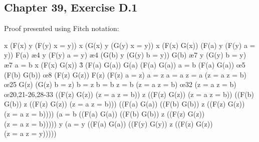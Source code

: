 \documentclass[10pt]{article}
\begin{document}
\subsection*{Chapter 39, Exercise D.1}

Proof presented using Fitch notation:

\begin{fitchproof}[arrayenv=longtable]
   {\exists x (F(x) \land \forall y (F(y) \to x = y))} 
   {\exists x (G(x) \land \forall y (G(y) \to x = y))} 
   {\forall x \neg (F(x) \land G(x))} 
  \open
   {(F(a) \land \forall y (F(y) \to a = y))} 
   {F(a)} \ae{4}
   {\forall y (F(y) \to a = y)} \ae{4}
  \open
   {(G(b) \land \forall y (G(y) \to b = y))} 
   {G(b)} \ae{7}
   {\forall y (G(y) \to b = y)} \ae{7}
  \open
   {a = b} 
   {\forall x \neg (F(x) \land G(x))} \r{3}
   {\neg (F(a) \land G(a))} 
   {G(a)} 
   {(F(a) \land G(a))} 
   {\bot} 
  \close
   {\neg a = b} 
   {(F(a) \lor G(a))} \oe{5}
   {(F(b) \lor G(b))} \oe{8}
  \open
   {(F(z) \lor G(z))} 
  \open
   {F(z)} 
   {(F(z) \to a = z)} 
   {a = z} 
   {a = a} 
   {z = a} 
   {(z = a \lor z = b)} \oe{25}
  \close
  \open
   {G(z)} 
   {(G(z) \to b = z)} 
   {b = z} 
   {b = b} 
   {z = b} 
   {(z = a \lor z = b)} \oe{32}
  \close
   {(z = a \lor z = b)} \oe{20,21-26,28-33}
  \close
   {((F(z) \lor G(z)) \to (z = a \lor z = b))} 
   {\forall z ((F(z) \lor G(z)) \to (z = a \lor z = b))} 
   {((F(b) \lor G(b)) \land \forall z ((F(z) \lor G(z)) \to (z = a \lor z = b)))} 
   {((F(a) \lor G(a)) \land ((F(b) \lor G(b)) \land \forall z ((F(z) \lor G(z)) \\ \quad \to (z = a \lor z = b))))} 
   {(\neg a = b \land ((F(a) \lor G(a)) \land ((F(b) \lor G(b)) \land \forall z ((F(z) \lor G(z)) \\ \quad \to (z = a \lor z = b)))))} 
   {\exists y (\neg a = y \land ((F(a) \lor G(a)) \land ((F(y) \lor G(y)) \land \forall z ((F(z) \lor G(z)) \\ \quad \to (z = a \lor z = y)))))} 

\end{fitchproof}
\end{document}
